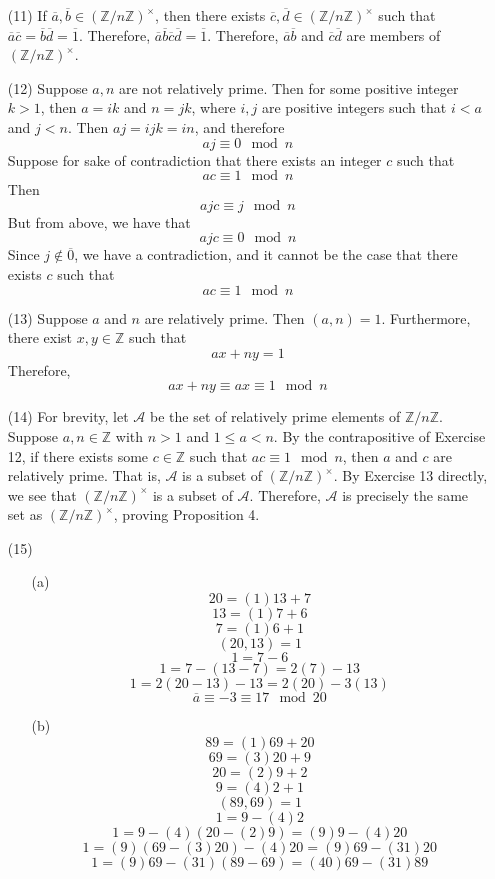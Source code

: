 \documentclass[12pt]{article}
\begin{document}
\begin{itemize}
\item[(11)] If $\overline{a}, \overline{b} \in (\mathbb{Z}/n\mathbb{Z})^\times$, then there exists $\overline{c}, \overline{d} \in (\mathbb{Z}/n\mathbb{Z})^\times$ such that $\overline{a}\overline{c} = \overline{b}\overline{d} = \overline{1}$. Therefore, $\overline{a}\overline{b}\overline{c}\overline{d} = \overline{1}$. Therefore, $\overline{a}\overline{b}$ and $\overline{c}\overline{d}$ are members of $(\mathbb{Z}/n\mathbb{Z})^\times$.
\item[(12)] Suppose $a, n$ are not relatively prime. Then for some positive integer $k > 1$, then $a = ik$ and $n = jk$, where $i, j$ are positive integers such that $i < a$ and $j < n$. Then $aj = ijk = in$, and therefore
$$aj \equiv 0 \mod n$$
Suppose for sake of contradiction that there exists an integer $c$ such that 
$$ac \equiv 1 \mod n$$
Then 
$$ajc \equiv j \mod n$$
But from above, we have that 
$$ajc \equiv 0 \mod n$$
Since $j \not \in \overline{0}$, we have a contradiction, and it cannot be the case that there exists $c$ such that
$$ac \equiv 1 \mod n$$
\item[(13)] Suppose $a$ and $n$ are relatively prime. Then $(a, n) = 1$. Furthermore, there exist $x, y \in \mathbb{Z}$ such that
$$ax + ny = 1$$
Therefore,
$$ax + ny \equiv ax \equiv 1 \mod n$$
\item[(14)] For brevity, let $\mathcal{A}$ be the set of relatively prime elements of $\mathbb{Z}/n\mathbb{Z}$. Suppose $a, n \in \mathbb{Z}$ with $n > 1$ and $1 \leq a < n$. By the contrapositive of Exercise 12, if there exists some $c \in \mathbb{Z}$ such that $ac \equiv 1 \mod n$, then $a$ and $c$ are relatively prime. That is, $\mathcal{A}$ is a subset of $(\mathbb{Z}/n\mathbb{Z})^\times$. By Exercise 13 directly, we see that $(\mathbb{Z}/n\mathbb{Z})^\times$ is a subset of $\mathcal{A}$. Therefore, $\mathcal{A}$ is precisely the same set as $(\mathbb{Z}/n\mathbb{Z})^\times$, proving Proposition 4.
\item[(15)]
\begin{itemize}
\item[(a)]
$$20 = (1)13 + 7$$
$$13 = (1)7 + 6$$
$$7 = (1)6 + 1$$
$$(20, 13) = 1$$
$$1 = 7 - 6$$
$$1 = 7 - (13 - 7) = 2(7) - 13$$
$$1 = 2(20 - 13) - 13 = 2(20) - 3(13)$$
$$\overline{a} \equiv -3 \equiv 17 \mod 20$$
\item[(b)]
$$89 = (1)69 + 20$$
$$69 = (3)20 + 9$$
$$20 = (2)9 + 2$$
$$9 = (4)2 + 1$$
$$(89, 69) = 1$$
$$1 = 9 - (4)2$$
$$1 = 9 - (4)(20 - (2)9) = (9)9 - (4)20$$
$$1 = (9)(69 - (3)20) - (4)20 = (9)69 - (31)20$$
$$1 = (9)69 - (31)(89 - 69) = (40)69 - (31)89$$

\end{itemize}
\end{itemize}
\end{document}
